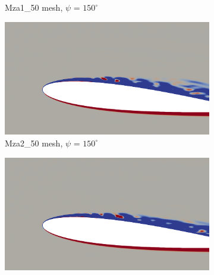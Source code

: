 \begin{figure}[H]
\begin{subfigure}[b]{0.475\textwidth}
		\caption{Mza1\_50 mesh, $\psi$ = $150^\circ$}
		\label{fig:Mza1_50_sp_psi150}
	\end{subfigure}
	\begin{subfigure}[b]{0.475\textwidth}
		\centering
		\includegraphics[width=1\textwidth]{figures/zonal_adapt_results/vorticity_plots/v2/Mza2_50/spavg/phase_150.png}
		\caption{Mza2\_50 mesh, $\psi$ = $150^\circ$}
		\label{fig:Mza2_50_sp_psi150}
	\end{subfigure}	
	\begin{subfigure}[b]{0.475\textwidth}
		\centering
		\includegraphics[width=1\textwidth]{figures/zonal_adapt_results/vorticity_plots/v2/Mza2_100/spavg/phase_150.png}

\end{subfigure}
\end{figure}
